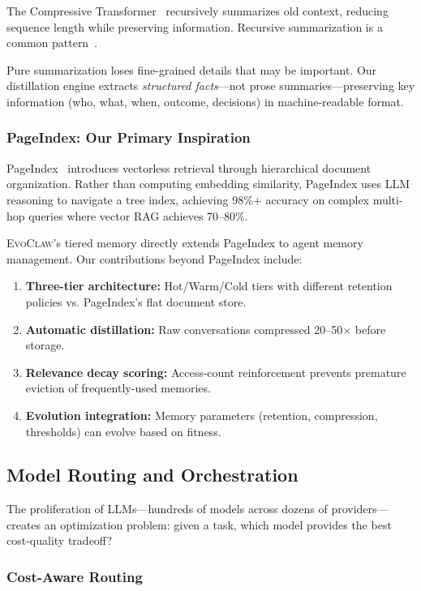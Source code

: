 \documentclass{article}
\newcommand{\evoclaw}{\textsc{EvoClaw}}
\begin{document}
The Compressive Transformer~\cite{rae2019compressive} recursively summarizes old context, reducing sequence length while preserving information. Recursive summarization is a common pattern~\cite{wu2023scaling}.

Pure summarization loses fine-grained details that may be important. Our distillation engine extracts \textit{structured facts}—not prose summaries—preserving key information (who, what, when, outcome, decisions) in machine-readable format.

\subsubsection{PageIndex: Our Primary Inspiration}

PageIndex~\cite{vectifyai_pageindex} introduces vectorless retrieval through hierarchical document organization. Rather than computing embedding similarity, PageIndex uses LLM reasoning to navigate a tree index, achieving 98\%+ accuracy on complex multi-hop queries where vector RAG achieves 70--80\%.

\evoclaw{}'s tiered memory directly extends PageIndex to agent memory management. Our contributions beyond PageIndex include:

\begin{enumerate}[leftmargin=*]
    \item \textbf{Three-tier architecture:} Hot/Warm/Cold tiers with different retention policies vs. PageIndex's flat document store.
    \item \textbf{Automatic distillation:} Raw conversations compressed 20--50$\times$ before storage.
    \item \textbf{Relevance decay scoring:} Access-count reinforcement prevents premature eviction of frequently-used memories.
    \item \textbf{Evolution integration:} Memory parameters (retention, compression, thresholds) can evolve based on fitness.
\end{enumerate}

\subsection{Model Routing and Orchestration}

The proliferation of LLMs—hundreds of models across dozens of providers—creates an optimization problem: given a task, which model provides the best cost-quality tradeoff?

\subsubsection{Cost-Aware Routing}
\end{document}
